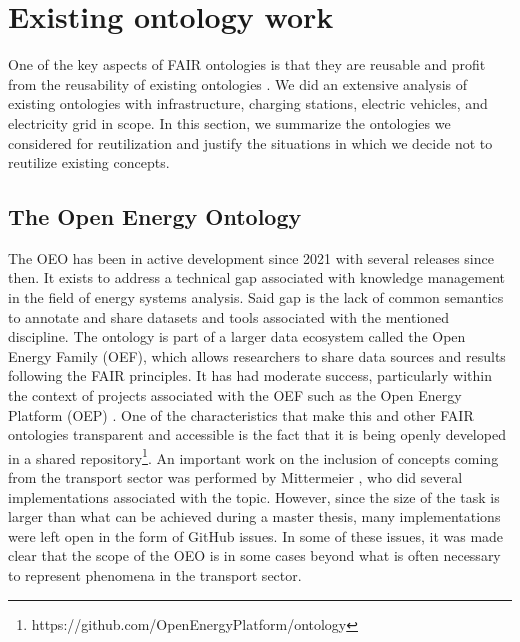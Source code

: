 \section{Existing ontology work}
\label{existingontologies}

One of the key aspects of FAIR ontologies is that they are reusable and profit
from the reusability of existing ontologies \cite{PovedaVillalon.2020}. We did
an extensive analysis of existing ontologies with infrastructure, charging
stations, electric vehicles, and electricity grid in scope. In this section, we
summarize the ontologies we considered for reutilization and justify the
situations in which we decide not to reutilize existing concepts.


\subsection{The Open Energy Ontology}

The OEO has been in active development since 2021 with several releases since
then. It exists to address a technical gap associated with knowledge management
in the field of energy systems analysis. Said gap is the lack of common
semantics to annotate and share datasets and tools associated with the mentioned
discipline. The ontology is part of a larger data ecosystem called the Open
Energy Family (OEF), which allows researchers to share data sources and results
following the FAIR principles. It has had moderate success, particularly within
the context of projects associated with the OEF such as the Open Energy Platform
(OEP) \cite{Hulk.2024}. One of the characteristics that make this and other FAIR
ontologies transparent and accessible is the fact that it is being openly
developed in a shared
repository\footnote{https://github.com/OpenEnergyPlatform/ontology}. An
important work on the inclusion of concepts coming from the transport sector was
performed by Mittermeier \cite{Mittermeier.2023}, who did several
implementations associated with the topic. However, since the size of the task
is larger than what can be achieved during a master thesis, many implementations
were left open in the form of GitHub issues. In some of these issues, it was
made clear that the scope of the OEO is in some cases beyond what is often
necessary to represent phenomena in the transport sector.


